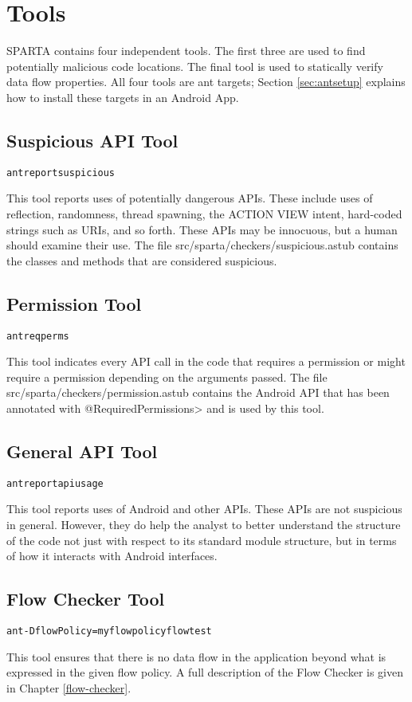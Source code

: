 \htmlhr
\chapter{Tools\label{tools}}

SPARTA contains four independent tools.  The first three are used to find potentially malicious code locations.  The final tool is used to statically verify data flow properties.  All four tools are ant targets;  Section
\ref{sec:antsetup} explains how to install these targets in an Android App.

\section{Suspicious API Tool}

\begin{alltt}
ant reportsuspicious
\end{alltt}


This tool reports uses of potentially dangerous APIs. These include uses of reflection, randomness, thread spawning, the ACTION VIEW intent, hard-coded strings such as URIs, and so forth. These APIs may be innocuous, but a human should examine their use.  The file src/sparta/checkers/suspicious.astub contains the classes and methods that are considered suspicious. 

\section{Permission Tool}
 
 \begin{alltt}
ant reqperms
\end{alltt}
 
This tool indicates every API call in the code that requires a permission or might require a permission 
depending on the arguments passed.  The file src/sparta/checkers/permission.astub contains the Android API that has been annotated with \<@RequiredPermissions> and is used by this tool.

\section{General API Tool}

\begin{alltt}
ant reportapiusage
\end{alltt}

This tool reports uses of Android and other APIs. These APIs are not suspicious in general. However, they do help the analyst to better understand the structure of the code not just with respect to its standard module structure, but in terms of how it interacts with Android interfaces. 

\section{Flow Checker Tool}

\begin{alltt}
ant -DflowPolicy=myflowpolicy flow test
\end{alltt}

This tool ensures that there is no data flow in the application beyond what is expressed in the given flow policy.  A full description of the Flow Checker is given in Chapter \ref{flow-checker}. 


